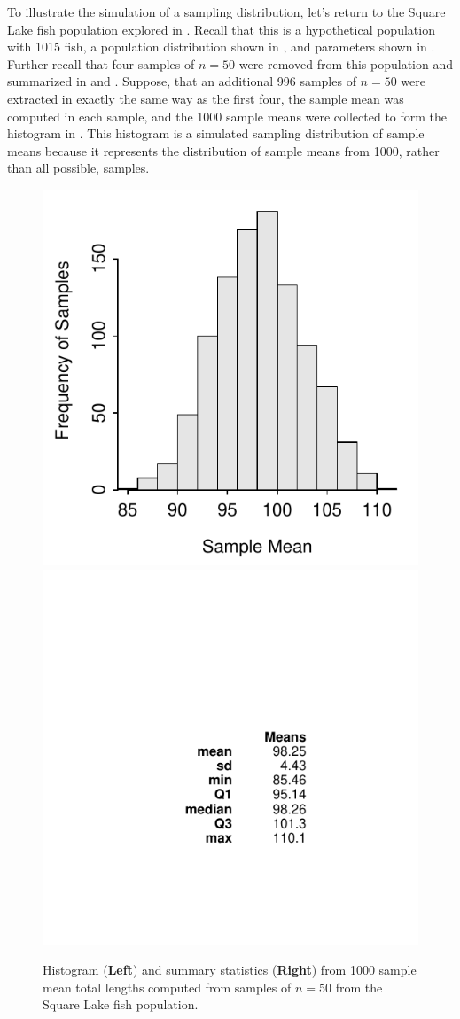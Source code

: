 \documentclass[10pt,openany]{book}\usepackage[]{graphicx}\usepackage[]{color}
\newenvironment{knitrout}{}{} %
\begin{document}

To illustrate the simulation of a sampling distribution, let's return to the Square Lake fish population explored in .  Recall that this is a hypothetical population with 1015 fish, a population distribution shown in , and parameters shown in .  Further recall that four samples of $n=50$ were removed from this population and summarized in  and .  Suppose, that an additional 996 samples of $n=50$ were extracted in exactly the same way as the first four, the sample mean was computed in each sample, and the 1000 sample means were collected to form the histogram in .  This histogram is a simulated sampling distribution of sample means because it represents the distribution of sample means from 1000, rather than all possible, samples.

\begin{knitrout}
\color{fgcolor}\begin{figure}[hbtp]

{\centering \includegraphics[width=.4\linewidth]{Figs/SampDistSLMean50-1} 
\includegraphics[width=.4\linewidth]{Figs/SampDistSLMean50-2} 

}

\caption[Histogram (\textbf{Left}) and summary statistics (\textbf{Right}) from 1000 sample mean total lengths computed from samples of $n=50$ from the Square Lake fish population]{Histogram (\textbf{Left}) and summary statistics (\textbf{Right}) from 1000 sample mean total lengths computed from samples of $n=50$ from the Square Lake fish population.}\label{fig:SampDistSLMean50}
\end{figure}


\end{knitrout}
\end{document}
